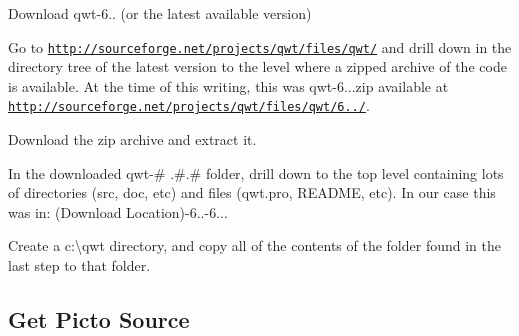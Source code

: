 \begin{DoxyEnumerate}
\item Download qwt-\/6.. (or the latest available version)
\begin{DoxyEnumerate}
\item Go to \href{http://sourceforge.net/projects/qwt/files/qwt/}{\tt http\-://sourceforge.\-net/projects/qwt/files/qwt/} and drill down in the directory tree of the latest version to the level where a zipped archive of the code is available. At the time of this writing, this was qwt-\/6...\-zip available at \href{http://sourceforge.net/projects/qwt/files/qwt/6.1.0/}{\tt http\-://sourceforge.\-net/projects/qwt/files/qwt/6../}.
\item Download the zip archive and extract it.
\end{DoxyEnumerate}
\item In the downloaded qwt-\/\# .\#.\# folder, drill down to the top level containing lots of directories (src, doc, etc) and files (qwt.\-pro, R\-E\-A\-D\-M\-E, etc). In our case this was in\-: (Download Location)-\/6..-\/6...
\item Create a c\-:\textbackslash{}qwt directory, and copy all of the contents of the folder found in the last step to that folder.
\end{DoxyEnumerate}\hypertarget{build_environment_preparation_get_picto_src}{}\subsection{Get Picto Source}\label{build_environment_preparation_get_picto_src}

